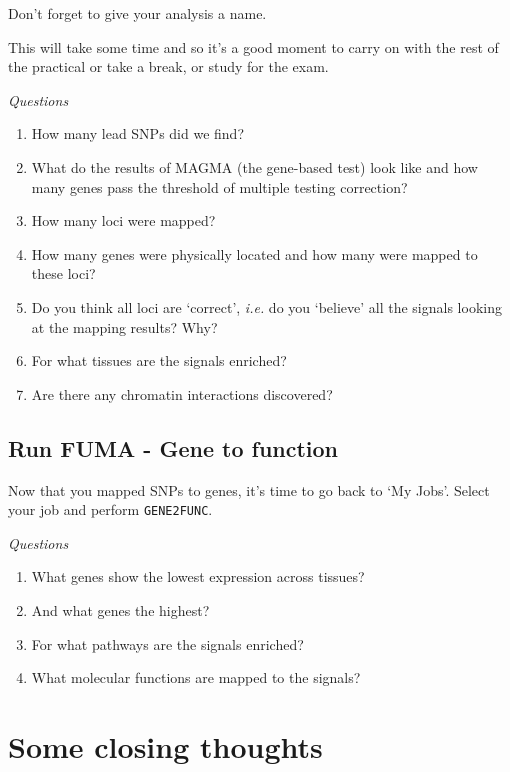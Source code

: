 \documentclass[
]{book}
\providecommand{\tightlist}{%
  \setlength{\itemsep}{0pt}\setlength{\parskip}{0pt}}
\begin{document}
Don't forget to give your analysis a name.

This will take some time and so it's a good moment to carry on with the rest of the practical or take a break, or study for the exam.

\emph{Questions}

\begin{enumerate}
\def\labelenumi{\arabic{enumi}.}
\tightlist
\item
  How many lead SNPs did we find?
\item
  What do the results of MAGMA (the gene-based test) look like and how many genes pass the threshold of multiple testing correction?
\item
  How many loci were mapped?
\item
  How many genes were physically located and how many were mapped to these loci?
\item
  Do you think all loci are `correct', \emph{i.e.} do you `believe' all the signals looking at the mapping results? Why?
\item
  For what tissues are the signals enriched?
\item
  Are there any chromatin interactions discovered?
\end{enumerate}

\hypertarget{run-fuma---gene-to-function}{%
\subsection{Run FUMA - Gene to function}\label{run-fuma---gene-to-function}}

Now that you mapped SNPs to genes, it's time to go back to `My Jobs'. Select your job and perform \texttt{GENE2FUNC}.

\emph{Questions}

\begin{enumerate}
\def\labelenumi{\arabic{enumi}.}
\tightlist
\item
  What genes show the lowest expression across tissues?
\item
  And what genes the highest?
\item
  For what pathways are the signals enriched?
\item
  What molecular functions are mapped to the signals?
\end{enumerate}

\hypertarget{some-closing-thoughts}{%
\section{Some closing thoughts}\label{some-closing-thoughts}}
\end{document}
